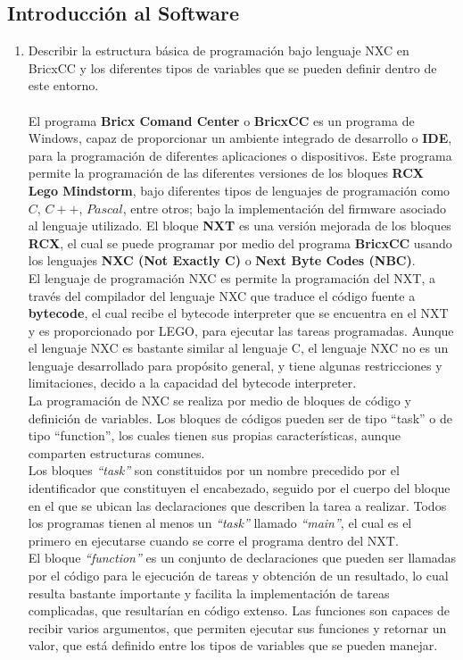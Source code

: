 \documentclass[twocolumn]{IEEEtran}
\begin{document}
\subsection{Introducción al Software}
\begin{enumerate}
 \item  Describir la estructura básica de programación bajo lenguaje NXC en BricxCC y los diferentes tipos de variables que se pueden definir dentro de este entorno.\\\\
El programa \textbf{Bricx Comand Center} o \textbf{BricxCC} es un programa de Windows, capaz de proporcionar un ambiente integrado de desarrollo o \textbf{IDE}, para la programación de diferentes aplicaciones o dispositivos. Este  programa permite la programación de las diferentes versiones de los bloques \textbf{RCX Lego Mindstorm}, bajo diferentes tipos de lenguajes de programación como $C$, $C++$, $Pascal$, entre otros; bajo la implementación del firmware asociado al lenguaje utilizado. El bloque \textbf{NXT} es una versión mejorada de los bloques \textbf{RCX}, el cual se puede programar por medio del programa \textbf{BricxCC} usando los lenguajes \textbf{NXC (Not Exactly C)} o \textbf{Next Byte Codes (NBC)}.\\
El lenguaje de programación NXC es permite la programación del NXT, a través del compilador del lenguaje NXC que traduce el código fuente a \textbf{bytecode}, el cual recibe el bytecode interpreter que se encuentra en el NXT y es proporcionado por LEGO, para ejecutar las tareas programadas. Aunque el lenguaje NXC es bastante similar al lenguaje C, el lenguaje NXC no es un lenguaje desarrollado para propósito general, y tiene algunas restricciones y limitaciones, decido a la capacidad del bytecode interpreter.\\
La programación de NXC se realiza por medio de bloques de código y definición de variables. Los bloques de códigos pueden ser de tipo “task” o de tipo “function”, los cuales tienen sus propias características, aunque comparten estructuras comunes. \\
Los bloques \textit{``task''}  son constituidos por un nombre precedido por el identificador que constituyen el encabezado, seguido por el cuerpo del bloque en el que se ubican las declaraciones que describen la tarea a realizar. Todos los programas tienen al menos un \textit{``task''} llamado \textit{``main''}, el cual es el primero en ejecutarse cuando se corre el programa dentro del NXT.\\
El bloque \textit{``function''} es un conjunto de declaraciones que pueden ser llamadas por el código para le ejecución de tareas y obtención de un resultado, lo cual resulta bastante importante y facilita la implementación de tareas complicadas, que resultarían en código extenso. Las funciones son capaces de recibir varios argumentos, que permiten ejecutar sus funciones y retornar un valor, que está definido entre los tipos de variables que se pueden manejar.\\

\end{enumerate}
\end{document}
